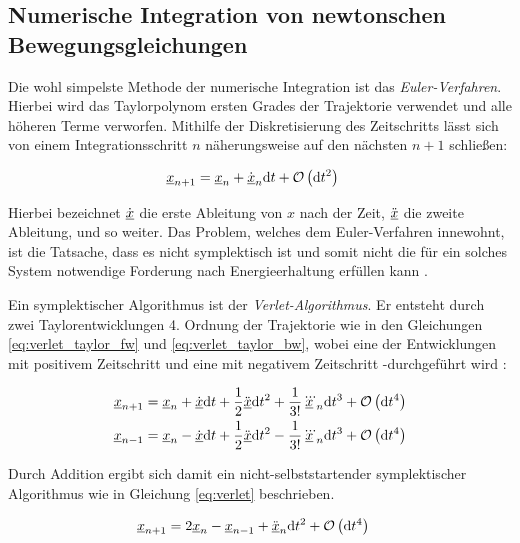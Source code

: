 	\subsection{Numerische Integration von newtonschen Bewegungsgleichungen}
		Die wohl simpelste Methode der numerische Integration ist das \emph{Euler-Verfahren}.
		Hierbei wird das Taylorpolynom ersten Grades der Trajektorie verwendet und alle höheren
		Terme verworfen. Mithilfe der Diskretisierung des Zeitschritts \dt lässt sich von einem
		Integrationsschritt $n$ näherungsweise auf den nächsten $n+1$ schließen:

		\begin{align}
			\underline{x}_{n+1} &= \underline{x}_n + \dot{\underline{x}}_n \text{d} t + \operatorname{\mathcal{O}}\left(\text{d} t^2\right)
		\end{align}

		Hierbei bezeichnet $\dot{\underline{x}}$ die erste Ableitung von $x$ nach der Zeit,
		$\ddot{\underline{x}}$ die zweite Ableitung, und so weiter. Das Problem, welches dem
		Euler-Verfahren innewohnt, ist die Tatsache, dass es nicht symplektisch ist und somit
		nicht die für ein solches System notwendige Forderung nach Energieerhaltung erfüllen kann
		\cite[S. 6f]{klein2013klassische}.

		Ein symplektischer Algorithmus ist der \emph{Verlet-Algorithmus}. Er entsteht durch zwei
		Taylorentwicklungen 4. Ordnung der Trajektorie wie in den Gleichungen
		\eqref{eq:verlet_taylor_fw} und \eqref{eq:verlet_taylor_bw}, wobei eine der Entwicklungen
		mit positivem Zeitschritt \dt und eine mit negativem Zeitschritt -\dt durchgeführt wird
		\cite[S. 69f]{frenkel2001understanding}:

		\begin{align}
			\underline{x}_{n+1} &= \underline{x}_n + \dot{\underline{x}}\text{d} t + \frac{1}{2}\ddot{\underline{x}}\text{d} t^2
				+ \frac{1}{3!}\dddot{\underline{x}}_n\text{d} t^3 + \operatorname{\mathcal{O}}\left(\text{d} t^4\right)
				\label{eq:verlet_taylor_fw} \\
			\underline{x}_{n-1} &= \underline{x}_n - \dot{\underline{x}}\text{d} t + \frac{1}{2}\ddot{\underline{x}}\text{d} t^2
				- \frac{1}{3!}\dddot{\underline{x}}_n\text{d} t^3 + \operatorname{\mathcal{O}}\left(\text{d} t^4\right)
				\label{eq:verlet_taylor_bw}
		\end{align}

		Durch Addition ergibt sich damit ein nicht-selbststartender symplektischer Algorithmus wie
		in Gleichung \eqref{eq:verlet} beschrieben.

		\begin{align}
			\underline{x}_{n+1} &= 2 \underline{x}_n - \underline{x}_{n-1} + \ddot{\underline{x}}_n\text{d} t^2
				+ \operatorname{\mathcal{O}}\left(\text{d} t^4\right) \label{eq:verlet}
		\end{align}

